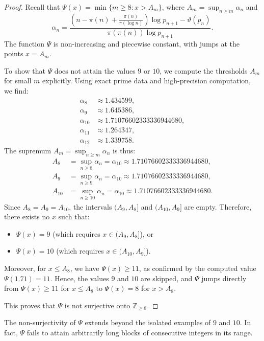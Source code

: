 \documentclass[10pt]{amsart}
\theoremstyle{definition} %
\numberwithin{equation}{section}
\begin{document}
\begin{proof}
Recall that $\Psi(x) = \min \{ m \geq 8 : x > A_m \}$, where $A_m = \sup_{n \geq m} \alpha_n$ and
\[
\alpha_n = \frac{\left( n - \pi(n) + \frac{\pi(n)}{\pi(\log n)} \right) \log p_{n+1} - \vartheta(p_n)}{\pi(\pi(n)) \log p_{n+1}}.
\]
The function $\Psi$ is non-increasing and piecewise constant, with jumps at the points $x = A_m$.

To show that $\Psi$ does not attain the values $9$ or $10$, we compute the thresholds $A_m$ for small $m$ explicitly. Using exact prime data and high-precision computation, we find:
\begin{align*}
\alpha_8 &\approx 1.434599, \\
\alpha_9 &\approx 1.645386, \\
\alpha_{10} &\approx 1.71076602333336944680, \\
\alpha_{11} &\approx 1.264347, \\
\alpha_{12} &\approx 1.339758.
\end{align*}
The supremum $A_m = \sup_{n \geq m} \alpha_n$ is thus:
\begin{align*}
A_8 &= \sup_{n \geq 8} \alpha_n = \alpha_{10} \approx 1.71076602333336944680, \\
A_9 &= \sup_{n \geq 9} \alpha_n = \alpha_{10} \approx 1.71076602333336944680, \\
A_{10} &= \sup_{n \geq 10} \alpha_n = \alpha_{10} \approx 1.71076602333336944680.
\end{align*}
Since $A_8 = A_9 = A_{10}$, the intervals $(A_9, A_8]$ and $(A_{10}, A_9]$ are empty. Therefore, there exists no $x$ such that:
\begin{itemize}
\item $\Psi(x) = 9$ (which requires $x \in (A_9, A_8]$), or
\item $\Psi(x) = 10$ (which requires $x \in (A_{10}, A_9]$).
\end{itemize}
Moreover, for $x \leq A_8$, we have $\Psi(x) \geq 11$, as confirmed by the computed value $\Psi(1.71) = 11$. Hence, the values $9$ and $10$ are skipped, and $\Psi$ jumps directly from $\Psi(x) \geq 11$ for $x \leq A_8$ to $\Psi(x) = 8$ for $x > A_8$.

This proves that $\Psi$ is not surjective onto $\mathbb{Z}_{\geq 8}$.
\end{proof}

The non-surjectivity of $\Psi$ extends beyond the isolated examples of $9$ and $10$. In fact, $\Psi$ fails to attain arbitrarily long blocks of consecutive integers in its range.
\end{document}
